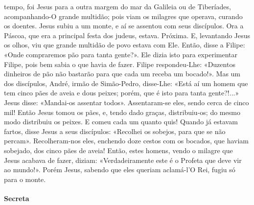 \begin{paracol}{2}
{ tempo, foi Jesus para a outra margem do mar da Galileia ou de Tiberíades, acompanhando-O grande multidão; pois viam os milagres que operava, curando os doentes. Jesus subiu a um monte, e aí se assentou com seus discípulos. Ora a Páscoa, que era a principal festa dos judeus, estava. Próxima. E, levantando Jesus os olhos, viu que grande multidão de povo estava com Ele. Então, disse a Filipe: «Onde compraremos pão para tanta gente?». Ele dizia isto para experimentar Filipe, pois bem sabia o que havia de fazer. Filipe respondeu-Lhe: «Duzentos dinheiros de pão não bastarão para que cada um receba um bocado!». Mas um dos discípulos, André, irmão de Simão-Pedro, disse-Lhe: «Está aí um homem que tem cinco pães de aveia e dous peixes; porém, que é isto para tanta gente?!...» Jesus disse: «Mandai-os assentar todos». Assentaram-se eles, sendo cerca de cinco mil! Então Jesus tomou os pães, e, tendo dado graças, distribuiu-os; do mesmo modo distribuiu os peixes. E comeu cada um quanto quis! Quando já estavam fartos, disse Jesus a seus discípulos: «Recolhei os sobejos, para que se não percam». Recolheram-nos eles, enchendo doze cestos com os bocados, que haviam sobejado, dos cinco pães de aveia! Então, estes homens, vendo o milagre que Jesus acabava de fazer, diziam: «Verdadeiramente este é o Profeta que deve vir ao mundo!». Porém Jesus, sabendo que eles queriam aclamá-l’O Rei, fugiu só para o monte.
}\end{paracol}

\begin{paracol}{2}\switchcolumn{}\end{paracol}

\paragraph{Secreta}
\begin{paracol}{2}\switchcolumn{}\end{paracol}

